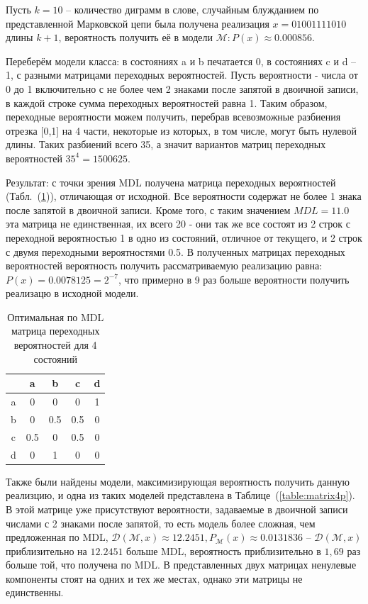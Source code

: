 \documentclass[12pt]{article}
\begin{document}
	Пусть $k = 10$ -- количество диграмм в слове, случайным блужданием по представленной Марковской цепи была получена реализация $x = 01001111010$ длины $k+1$, вероятность получить её в модели $\mathcal{M}: P(x) \approx 0.000856$.
	
	Переберём модели класса: в состояниях a и b печатается 0, в состояниях c и d -- 1, с разными матрицами переходных вероятностей. Пусть вероятности - числа от 0 до 1 включительно с не более чем 2 знаками после запятой в двоичной записи, в каждой строке сумма переходных вероятностей равна 1. Таким образом, переходные вероятности можем получить, перебрав всевозможные разбиения отрезка [0,1] на 4 части, некоторые из которых, в том числе, могут быть нулевой длины. Таких разбиений всего 35, а значит вариантов матриц переходных вероятностей $35^4 = 1 500 625$.
	
	Результат: с точки зрения MDL получена матрица переходных вероятностей (Табл.~(\ref{table:matrix4MDL})), отличающая от исходной. Все вероятности содержат не более 1 знака после запятой в двоичной записи. Кроме того, с таким значением $MDL = 11.0$ эта матрица не единственная, их всего 20 - они так же все состоят из 2 строк с переходной вероятностью 1 в одно из состояний, отличное от текущего, и 2 строк с двумя переходными вероятностями 0.5. В полученных матрицах переходных вероятностей вероятность получить рассматриваемую реализацию равна: $P(x) = 0.0078125 = 2^{-7}$, что примерно в 9 раз больше вероятности получить реализацю в исходной модели.
	
	\begin{table}[!h]
		\caption{Оптимальная по MDL матрица переходных вероятностей для 4 состояний}
		\label{table:matrix4MDL}
		\begin{center}
			\begin{tabular}{|c|c|c|c|c|}
				\hline
				& a & b & c & d \\
				\hline
				a & 0 & 0 & 0 & 1\\
				\hline
				b & 0 & 0.5 & 0.5 & 0 \\
				\hline
				c & 0.5 & 0 & 0.5 & 0 \\
				\hline
				d & 0 & 1 & 0 & 0 \\
				\hline
			\end{tabular}
		\end{center}
	\end{table}

	Также были найдены модели, максимизирующая вероятность получить данную реализцию, и одна из таких моделей представлена в Таблице~(\ref{table:matrix4p}). В этой матрице уже присутствуют вероятности, задаваемые в двоичной записи числами с 2 знаками после запятой, то есть модель более сложная, чем предложенная по MDL, $\mathcal{D}(\mathcal{M},x)\approx12.2451, P_{\mathcal{M}}(x)\approx 0.0131836$ -- $\mathcal{D}(\mathcal{M},x)$ приблизительно на $12.2451$ больше MDL, вероятность приблизительно в $1,69$ раз больше той, что получена по MDL.  В представленных двух матрицах ненулевые компоненты стоят на одних и тех же местах, однако эти матрицы не единственны.
\end{document}
